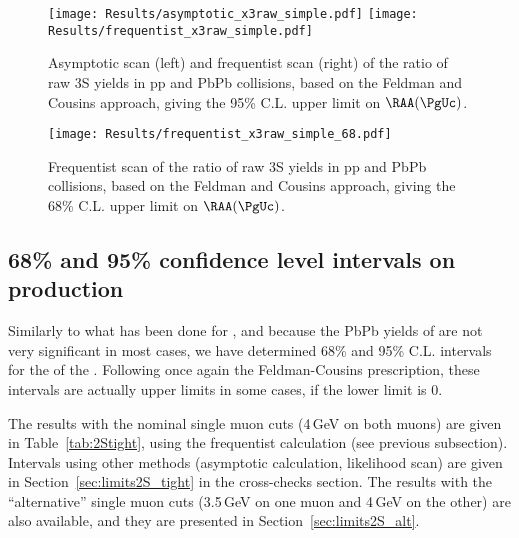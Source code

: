 \begin{figure}[h]
\begin{centering}       
  \texttt{[image: Results/asymptotic\_x3raw\_simple.pdf]}
  \texttt{[image: Results/frequentist\_x3raw\_simple.pdf]}
  \caption{Asymptotic scan (left) and frequentist scan (right) of the ratio of raw 3S yields in pp and PbPb collisions, based on the Feldman and 
     Cousins approach, giving the 95\% C.L. upper limit on $\RAA(\PgUc)$.}
  \label{fig:3SUL} 
\end{centering}
\end{figure}

\begin{figure}[h]
\begin{centering}       
  \texttt{[image: Results/frequentist\_x3raw\_simple\_68.pdf]}
  \caption{Frequentist scan of the ratio of raw 3S yields in pp and PbPb collisions, based on the Feldman and Cousins approach, giving the 68\% C.L. upper limit on $\RAA(\PgUc)$.}
  \label{fig:3SUL_68} 
\end{centering}
\end{figure}

\vfill\newpage
\subsection{68\% and 95\% confidence level intervals on \PgUb production\label{sec:limits2S}}

Similarly to what has been done for \PgUc, and because the PbPb yields of \PgUb{} are not very significant in most cases, we have determined 68\% and 95\% C.L. intervals
for the \RAA{} of the \PgUb. Following once again the Feldman-Cousins prescription, these intervals are actually upper limits in some cases, if the lower limit is 0.

The results with the nominal single muon cuts (4\,GeV on both muons) are given in Table~\ref{tab:2Stight}, using the frequentist calculation (see previous subsection). 
Intervals using other methods (asymptotic calculation, likelihood scan) are given in Section~\ref{sec:limits2S_tight} in the cross-checks section.
The results with the ``alternative'' single muon cuts (3.5\,GeV on one muon and 4\,GeV on the other) are also available, and they are presented in 
Section~\ref{sec:limits2S_alt}.

